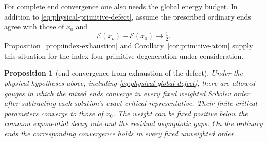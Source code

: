 \documentclass[11pt]{amsart}
\newtheorem{proposition}[theorem]{Proposition}
\theoremstyle{definition}
\theoremstyle{remark}
\theoremstyle{plain}
\newcommand{\cE}{\mathcal{E}}
\begin{document}
For complete end convergence one also needs the global energy
budget. In addition to \eqref{eq:physical-primitive-defect}, assume
the prescribed ordinary ends agree with those of $x_0$ and
\begin{equation}\label{eq:physical-global-defect}
                   \cE(x_\nu)-\cE(x_0)\longrightarrow\tfrac12.
\end{equation}
Proposition~\ref{prop:index-exhaustion} and
Corollary~\ref{cor:primitive-atom} supply this situation
for the index-four primitive degeneration under consideration.

\begin{proposition}[end convergence from exhaustion of the defect]
\label{prop:automatic-end-convergence}
Under the physical hypotheses above, including
\eqref{eq:physical-global-defect}, there are allowed gauges
in which the mixed ends converge in every fixed weighted
Sobolev order after subtracting each solution's exact
critical representative. Their finite critical parameters
converge to those of $x_0$. The weight can be fixed positive
below the common exponential decay rate and the residual
asymptotic gaps. On the ordinary ends the corresponding
convergence holds in every fixed unweighted order.
\end{proposition}
\end{document}
